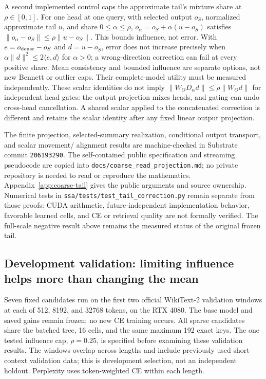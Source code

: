 \documentclass[11pt]{article}
\numberwithin{equation}{section}
\newcommand{\inner}[2]{\langle #1, #2\rangle}
\begin{document}
A second implemented control caps the approximate tail's mixture share at $\rho\in[0,1]$. For one head
at one query, with selected output $o_S$, normalized approximate tail $u$, and share $0\le\alpha\le\rho$,
$o_\alpha=o_S+\alpha(u-o_S)$ satisfies $\|o_\alpha-o_S\|\le\rho\|u-o_S\|$. This bounds influence,
not error. With $e=o_{\rm dense}-o_S$ and $d=u-o_S$, error does not increase precisely when
$\alpha\|d\|^2\le2\inner{e}{d}$ for $\alpha>0$; a wrong-direction correction can fail at every
positive share. Mean consistency and bounded influence are separate options, not new Bennett or outlier
caps. Their complete-model utility must be measured independently.
These scalar identities do not imply
$\|W_O D_\alpha d\|\le\rho\|W_Od\|$ for independent head gates: the output projection mixes heads,
and gating can undo cross-head cancellation. A shared scalar applied to the concatenated correction is
different and retains the scalar identity after any fixed linear output projection.

The finite projection, selected-summary realization, conditional output transport, and scalar movement/
alignment results are machine-checked in Substrate commit
\texttt{206193290}. The self-contained public specification and streaming
pseudocode are copied into \nolinkurl{docs/coarse_read_projection.md}; no private repository is needed to
read or reproduce the mathematics. Appendix~\ref{app:coarse-tail} gives the public arguments and source
ownership. Numerical tests in \nolinkurl{ssa/tests/test_tail_correction.py} remain separate from those
proofs: CUDA arithmetic, future-independent implementation behavior, favorable learned cells, and CE or
retrieval quality are not formally verified.
The full-scale negative result above remains the measured status of the original frozen tail.

\subsection{Development validation: limiting influence helps more than changing the mean}

Seven fixed candidates run on the first two official WikiText-2 validation windows at each of 512, 8192,
and 32768 tokens, on the RTX 4080. The base model and saved gains remain frozen; no new CE training occurs.
All sparse candidates share the batched tree, 16 cells, and the same maximum 192 exact keys. The one
tested influence cap, $\rho=0.25$, is specified before examining these validation results. The windows
overlap across lengths and include previously used short-context validation data; this is development
selection, not an independent holdout. Perplexity uses token-weighted CE within each length.
\end{document}
